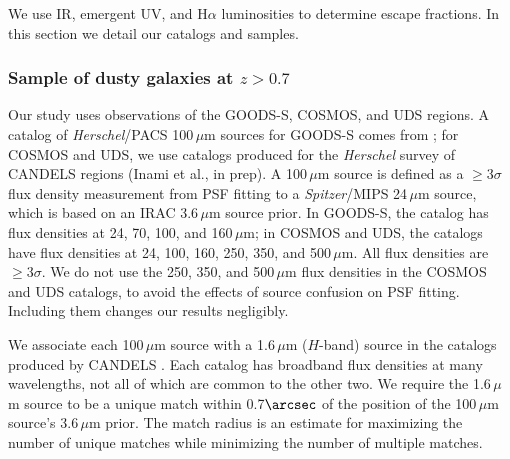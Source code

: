 \documentclass[referee]{aa}
\begin{document}
We use IR, emergent UV, and H$\alpha$ luminosities to determine escape
fractions.  In this section we detail our catalogs and samples.

\subsubsection{Sample of dusty galaxies at $z > 0.7$}

Our study uses observations of the GOODS-S, COSMOS, and UDS regions.  A
catalog of \emph{Herschel}/PACS 100$\,\mu$m sources for GOODS-S comes from
\citet{magnelli13}; for COSMOS and UDS, we use catalogs produced for the
\emph{Herschel} survey of CANDELS regions (Inami et al., in prep).  A
100$\,\mu$m source is defined as a $\ge 3\sigma$ flux density measurement
from PSF fitting to a \emph{Spitzer}/MIPS 24$\,\mu$m source, which is based
on an IRAC 3.6$\,\mu$m source prior.  In GOODS-S, the catalog has
flux densities at 24, 70, 100, and 160$\,\mu$m; in COSMOS and
UDS, the catalogs have flux densities at 24, 100, 160, 250, 350,
and 500$\,\mu$m.  All flux densities are $\ge 3\sigma$.  We do not use the
250, 350, and 500$\,\mu$m flux
densities in the COSMOS and UDS catalogs, to avoid the effects of source
confusion on PSF fitting.  Including them changes our results negligibly.

We associate each 100$\,\mu$m source with a 1.6$\,\mu$m ($H$-band) source
in the
catalogs produced by CANDELS
\citep[Nayyeri et al., in prep;][]{galametz13,guo13}.  Each catalog has
broadband flux densities at many wavelengths, not all of which are common to the
other two.  We require the 1.6$\,\mu$m source to be a unique match
within 0.7$\arcsec$ of the position of the 100$\,\mu$m source's
3.6$\,\mu$m prior.  The match radius is an estimate for maximizing the
number of unique matches while minimizing the number of multiple matches.
\end{document}
